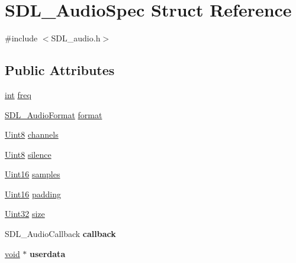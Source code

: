 \hypertarget{structSDL__AudioSpec}{}\section{S\+D\+L\+\_\+\+Audio\+Spec Struct Reference}
\label{structSDL__AudioSpec}


{\ttfamily \#include $<$S\+D\+L\+\_\+audio.\+h$>$}

\subsection*{Public Attributes}
\begin{DoxyCompactItemize}
\item 
\hyperlink{SDL__thread_8h_a6a64f9be4433e4de6e2f2f548cf3c08e}{int} \hyperlink{structSDL__AudioSpec_a8b823ce46fc2e448cf7e6fc141aff6b2}{freq}
\item 
\hyperlink{SDL__audio_8h_a491ed103fd25d920c4e6b7495217ce66}{S\+D\+L\+\_\+\+Audio\+Format} \hyperlink{structSDL__AudioSpec_ae37c634cac5807762f184c8d5d49fc2d}{format}
\item 
\hyperlink{SDL__stdinc_8h_a2944638813a090aa23e62f4da842c3e2}{Uint8} \hyperlink{structSDL__AudioSpec_a31fe8b3710cf23bbef24be8a1749fe46}{channels}
\item 
\hyperlink{SDL__stdinc_8h_a2944638813a090aa23e62f4da842c3e2}{Uint8} \hyperlink{structSDL__AudioSpec_addc462c8a806e6c122eccf63482048f6}{silence}
\item 
\hyperlink{SDL__stdinc_8h_a31fcc0a076c9068668173ee26d33e42b}{Uint16} \hyperlink{structSDL__AudioSpec_a2cdf5e885808c10bfa2810b706e69f95}{samples}
\item 
\hyperlink{SDL__stdinc_8h_a31fcc0a076c9068668173ee26d33e42b}{Uint16} \hyperlink{structSDL__AudioSpec_a738371fc13b54cefef4db16994abeeb6}{padding}
\item 
\hyperlink{SDL__stdinc_8h_add440eff171ea5f55cb00c4a9ab8672d}{Uint32} \hyperlink{structSDL__AudioSpec_a154cf44743ecec78c36dc6c827dd2fdb}{size}
\item 
\hypertarget{structSDL__AudioSpec_a1f8d05139f1679dcf359f49251233eac}{}S\+D\+L\+\_\+\+Audio\+Callback {\bfseries callback}\label{structSDL__AudioSpec_a1f8d05139f1679dcf359f49251233eac}

\item 
\hypertarget{structSDL__AudioSpec_aeec9481666f5f0982c98d3878f175d9b}{}\hyperlink{SDL__audio_8h_a52835ae37c4bb905b903cbaf5d04b05f}{void} $\ast$ {\bfseries userdata}\label{structSDL__AudioSpec_aeec9481666f5f0982c98d3878f175d9b}

\end{DoxyCompactItemize}


